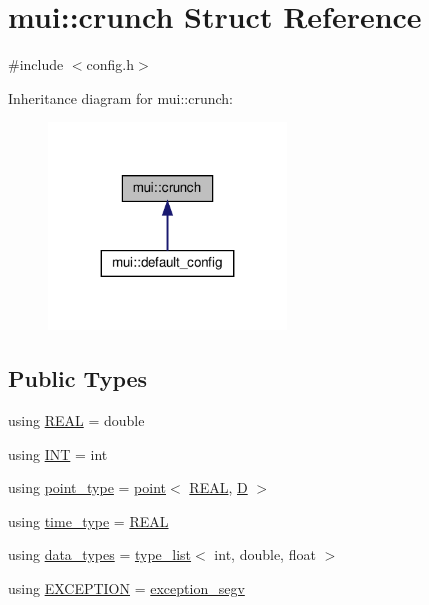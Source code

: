 \hypertarget{structmui_1_1crunch}{}\section{mui\+:\+:crunch Struct Reference}
\label{structmui_1_1crunch}


{\ttfamily \#include $<$config.\+h$>$}



Inheritance diagram for mui\+:\+:crunch\+:
\nopagebreak
\begin{figure}[H]
\begin{center}
\leavevmode
\includegraphics[width=179pt]{structmui_1_1crunch__inherit__graph}
\end{center}
\end{figure}
\subsection*{Public Types}
\begin{DoxyCompactItemize}
\item 
using \hyperlink{structmui_1_1crunch_a6f2cbcc30446f242a8e0a99400d29b69}{R\+E\+AL} = double
\item 
using \hyperlink{structmui_1_1crunch_a85f2c6d604af24d375168cd481228b70}{I\+NT} = int
\item 
using \hyperlink{structmui_1_1crunch_ae91784f5fa63d0dea1dcb4f37fe59ff5}{point\+\_\+type} = \hyperlink{structmui_1_1point}{point}$<$ \hyperlink{structmui_1_1crunch_a6f2cbcc30446f242a8e0a99400d29b69}{R\+E\+AL}, \hyperlink{structmui_1_1crunch_afa49250ca88779f6d39c0ab585120c2b}{D} $>$
\item 
using \hyperlink{structmui_1_1crunch_a6967823168cabd179daab1d81f817eba}{time\+\_\+type} = \hyperlink{structmui_1_1crunch_a6f2cbcc30446f242a8e0a99400d29b69}{R\+E\+AL}
\item 
using \hyperlink{structmui_1_1crunch_a0a0e3d165ddd799123f067a61e66c000}{data\+\_\+types} = \hyperlink{structmui_1_1type__list}{type\+\_\+list}$<$ int, double, float $>$
\item 
using \hyperlink{structmui_1_1crunch_aec04e38b4a056876eb72c8f570621bd5}{E\+X\+C\+E\+P\+T\+I\+ON} = \hyperlink{structmui_1_1exception__segv}{exception\+\_\+segv}
\end{DoxyCompactItemize}
